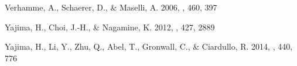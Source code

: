 \documentclass{emulateapj}
\begin{document}
\begin{thebibliography}{39}
{Verhamme}, A., {Schaerer}, D., \& {Maselli}, A. 2006, \aap, 460, 397

{Yajima}, H., {Choi}, J.-H., \& {Nagamine}, K. 2012, \mnras, 427, 2889

{Yajima}, H., {Li}, Y., {Zhu}, Q., {Abel}, T., {Gronwall}, C., \& {Ciardullo},
  R. 2014, \mnras, 440, 776

\end{thebibliography}
\end{document}
